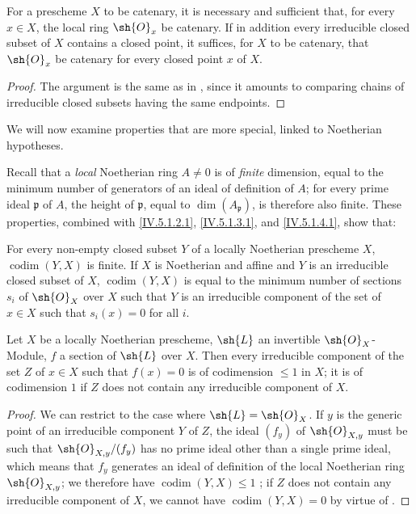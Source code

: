 \begin{corollary}[5.1.5]
\label{IV.5.1.5}
For a prescheme $X$ to be catenary, it is necessary and sufficient that, for every $x\in X$, the local ring $\sh{O}_x$ be catenary.
If in addition every irreducible closed subset of $X$ contains a closed point, it suffices, for $X$ to be catenary, that $\sh{O}_x$ be catenary for every closed point $x$ of $X$.
\end{corollary}

\begin{proof}
The argument is the same as in , since it amounts to comparing chains of irreducible closed subsets having the same endpoints.
\end{proof}

\begin{env}[5.1.6]
\label{IV.5.1.6}
We will now examine properties that are more special, linked to Noetherian hypotheses.

Recall  that a \emph{local} Noetherian ring $A\neq 0$ is of \emph{finite} dimension, equal to the minimum number of generators of an ideal of definition of $A$; for every prime ideal $\mathfrak{p}$ of $A$, the height of $\mathfrak{p}$, equal to $\dim(A_\mathfrak{p})$, is therefore also finite.
These properties, combined with \eqref{IV.5.1.2.1}, \eqref{IV.5.1.3.1}, and \eqref{IV.5.1.4.1}, show that:
\end{env}

\begin{proposition}[5.1.7]
\label{IV.5.1.7}
For every non-empty closed subset $Y$ of a locally Noetherian prescheme $X$, $\operatorname{codim}(Y,X)$ is finite.
If $X$ is Noetherian and affine and $Y$ is an irreducible closed subset of $X$, $\operatorname{codim}(Y,X)$ is equal to the minimum number of sections $s_i$ of $\sh{O}_X$ over $X$ such that $Y$ is an irreducible component of the set of $x\in X$ such that $s_i(x)=0$ for all $i$.
\end{proposition}

\begin{corollary}[5.1.8]
\label{IV.5.1.8}
Let $X$ be a locally Noetherian prescheme, $\sh{L}$ an invertible $\sh{O}_X$-Module, $f$ a section of $\sh{L}$ over $X$.
Then every irreducible component of the set $Z$ of $x\in X$ such that $f(x)=0$ is of codimension $\leq 1$ in $X$; it is of codimension $1$ if $Z$ does not contain any irreducible component of $X$.
\end{corollary}

\begin{proof}
We can restrict to the case where $\sh{L}=\sh{O}_X$.
If $y$ is the generic point of an irreducible component $Y$ of $Z$, the ideal $(f_y)$ of $\sh{O}_{X,y}$ must be such that $\sh{O}_{X,y}/(f_y)$ has no prime ideal other than a single prime ideal, which means that $f_y$ generates an ideal of definition of the local Noetherian ring $\sh{O}_{X,y}$; we therefore have $\operatorname{codim}(Y,X)\leq 1$ ; if $Z$ does not contain any irreducible component of $X$, we cannot have $\operatorname{codim}(Y,X)=0$ by virtue of .
\end{proof}

